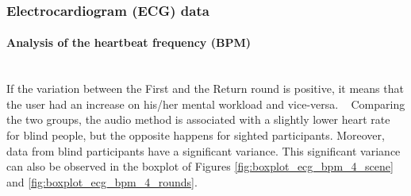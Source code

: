 \subsubsection{Electrocardiogram (ECG) data}
\label{subsubsec:results_ecg_2}

\paragraph*{Analysis of the heartbeat frequency (BPM)}\mbox{}\\

If the variation between the First and the Return round is positive, it means that the user had an increase on his/her mental workload and vice-versa. \ %
Comparing the two groups, the audio method is associated with a slightly lower heart rate for blind people, but the opposite happens for sighted participants. Moreover, data from blind participants have a significant variance. This significant variance can also be observed in the boxplot of Figures \ref{fig:boxplot_ecg_bpm_4_scene} and \ref{fig:boxplot_ecg_bpm_4_rounds}. 

%
%

